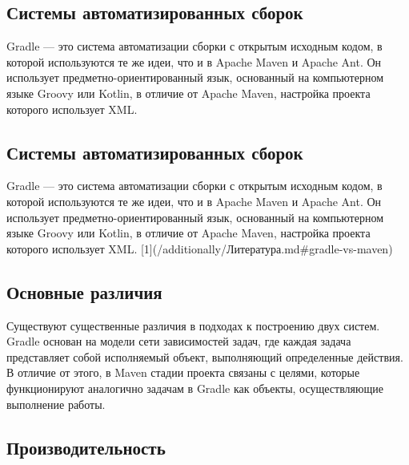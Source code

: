 \subsection{Системы автоматизированных сборок}

Gradle — это система автоматизации сборки с открытым исходным кодом, в которой используются те же
идеи, что и в Apache Maven и Apache Ant. Он использует предметно-ориентированный язык, основанный на
компьютерном языке Groovy или Kotlin, в отличие от Apache Maven, настройка проекта которого
использует XML.

\subsection{Системы автоматизированных сборок}

Gradle — это система автоматизации сборки с открытым исходным кодом, в которой используются те же
идеи, что и в Apache Maven и Apache Ant. Он использует предметно-ориентированный язык, основанный на
компьютерном языке Groovy или Kotlin, в отличие от Apache Maven, настройка проекта которого
использует XML.
[1](/additionally/Литература.md\#gradle-vs-maven)

\subsection{Основные различия}

Существуют существенные различия в подходах к построению двух систем. Gradle основан на модели сети
зависимостей задач, где каждая задача представляет собой исполняемый объект, выполняющий
определенные действия. В отличие от этого, в Maven стадии проекта связаны с целями, которые
функционируют аналогично задачам в Gradle как объекты, осуществляющие выполнение работы.

\subsection{Производительность}

